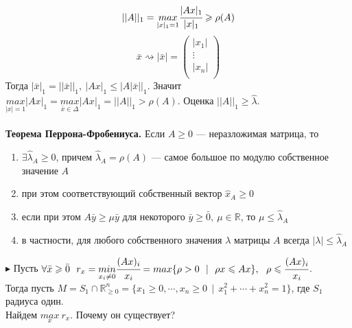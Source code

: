 \documentclass[12pt]{article}
\theoremstyle{definition}
\numberwithin{equation}{section}
\begin{document}
$$||A||_1=\underset{|x|_1=1}{max}\cfrac{|Ax|_1}{|x|_1} \geqslant \rho(A)$$
\[\bar x \rightsquigarrow |\bar x|= \begin{pmatrix}
|x_1|\\
\vdots\\
|x_n|\\
\end{pmatrix}\]
Тогда $|\bar x|_1=||\bar x||_1,~|Ax|_1\leqslant |A|\bar x||_1.$ Значит $\underset{|x|=1}{max}|Ax|_1=\underset{\bar x \in \Delta}{max}|Ax|_1=||A||_1>\rho(A)$. Оценка $||A||_1 \geqslant \hat \lambda$.
\\
\\
\textbf{Теорема Перрона-Фробениуса.} Если $A\geqslant 0$ --- неразложимая матрица, то 
\begin{enumerate}
    \item $\exists \hat \lambda_A \geqslant 0$, причем $\hat \lambda_A=\rho(A)$ --- самое большое по модулю собственное значение $A$
    \item при этом соответствующий собственный вектор $\hat x_A \geqslant 0$
    \item если при этом $A\bar y \geqslant \mu \bar y$ для некоторого $\bar y \geqslant \bar 0,~\mu \in \mathbb{R}$, то $\mu \leqslant \hat \lambda_A$
    \item в частности, для любого собственного значения $\lambda$ матрицы $A$ всегда $|\lambda|\leqslant \hat \lambda_A$
\end{enumerate}
$\blacktriangleright$ Пусть $\forall \bar x \geqslant \bar 0~~r_x=\underset{x_i \neq 0}{min} \cfrac{(Ax)_i}{x_i}=max \{ \rho >0 ~~|~~\rho x \leqslant Ax \},~~\rho \leqslant \cfrac{(Ax)_i}{x_i}$.\\
Тогда пусть $M=S_1 \cap \mathbb{R}^n_{\geqslant 0} = \{ x_1 \geqslant 0, \cdots, x_n \geqslant 0~~|~~x_1^2+\cdots +x_n^2=1\}$, где $S_1$ радиуса один.\\
Найдем $\underset{x}{max}~r_x$. Почему он существует?
\end{document}
